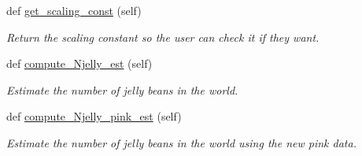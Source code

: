 \begin{DoxyCompactItemize}
def \hyperlink{class_est_num_jellies_1_1_num_jelly_estimator_a8cc61de7181d21d6c1da52ddc1e7d133}{get\+\_\+scaling\+\_\+const} (self)
\begin{DoxyCompactList}\small\item\em Return the scaling constant so the user can check it if they want. \end{DoxyCompactList}\item 
def \hyperlink{class_est_num_jellies_1_1_num_jelly_estimator_ab4f98f6a7600e03ebea6fe738588c483}{compute\+\_\+\+Njelly\+\_\+est} (self)
\begin{DoxyCompactList}\small\item\em Estimate the number of jelly beans in the world. \end{DoxyCompactList}\item 
def \hyperlink{class_est_num_jellies_1_1_num_jelly_estimator_a5a4f72a37cd411a42b24c9621c436a01}{compute\+\_\+\+Njelly\+\_\+pink\+\_\+est} (self)
\begin{DoxyCompactList}\small\item\em Estimate the number of jelly beans in the world using the new pink data. \end{DoxyCompactList}\end{DoxyCompactItemize}
